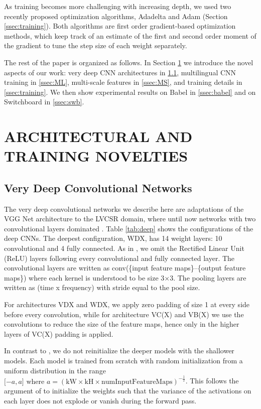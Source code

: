 \documentclass{article}
\begin{document}
As training becomes more challenging with increasing depth,
we used two recently proposed optimization algorithms, Adadelta \cite{zeiler2012adadelta} and Adam \cite{kingma2014adam}
(Section \ref{ssec:training}).
Both algorithms are first order gradient-based optimization methods, which keep track of an estimate of
the first and second order moment of the gradient to tune the step size of each weight separately.

The rest of the paper is organized as follows.
In Section \ref{sec:novelties} we introduce the novel aspects of our work:
very deep CNN architectures in \ref{ssec:deep}, multilingual CNN training in \ref{ssec:ML},
multi-scale features in \ref{ssec:MS}, and training details in \ref{ssec:training}.
We then show experimental results on Babel in \ref{ssec:babel} and on Switchboard in \ref{ssec:swb}.

\section{ARCHITECTURAL AND TRAINING NOVELTIES}
\label{sec:novelties}

\subsection{Very Deep Convolutional Networks}
\label{ssec:deep}
The very deep convolutional networks we describe here are adaptations of the VGG Net
architecture \cite{simonyan2014very} to the LVCSR domain, where until now
networks with two convolutional layers dominated \cite{sainath2013deep, soltau2014joint, saon2015ibm}.
Table \ref{tab:deep} shows the configurations of the deep CNNs.
The deepest configuration, WDX, has 14 weight layers: 10 convolutional and 4 fully connected.
As in \cite{simonyan2014very}, we omit the Rectified Linear Unit (ReLU) layers following
every convolutional and fully connected layer.
The convolutional layers are written as conv(\{input feature maps\}--\{output feature maps\}) where 
each kernel is understood to be size 3$\times$3.
The pooling layers are written as (time x frequency) with stride equal to the pool size.

For architectures VDX and WDX, we apply zero padding of size 1 at every side before every convolution,
while for architecture VC(X) and VB(X) we use the convolutions to reduce the size of the feature maps, 
hence only in the higher layers of VC(X) padding is applied.

In contrast to \cite{simonyan2014very}, we do not reinitialize the deeper models with the shallower models.
Each model is trained from scratch with random initialization from a uniform distribution in the range 
$\lbrack -a, a \rbrack \text{~where~} a = (\text{kW} \times \text{kH} \times \text{numInputFeatureMaps})^{-\frac{1}{2}}$.
This follows the argument of \cite{glorot2010understanding} to initialize the weights such that
the variance of the activations on each layer does not explode or vanish during the forward pass.
\end{document}
